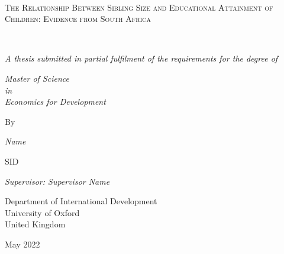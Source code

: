 \begin{titlepage}
	\centering
	\vspace*{1.5cm}
	\hrulefill\\
	\vspace{0.5cm}
	{\scshape\LARGE The Relationship Between Sibling Size and Educational Attainment of Children: Evidence from South Africa\par}
	\vspace{0.5cm}
	\hrulefill\\
	\vspace{1.5cm}

	{\normalsize\itshape A thesis submitted in partial fulfilment of the requirements for the degree of\par}
	
	\vspace{0.6cm}
	
	{\normalsize\itshape Master of Science \\ \vspace{0.2cm} in \\ \vspace{0.2cm} Economics for Development\par}
	
	\vspace{1.2cm}
	{\normalsize By \par}
	
	\vspace{1.2cm}
	{\large\itshape Name}
	
	\vspace{4pt}
	{\normalsize SID}
	
	\vspace{0.8cm}
	{\large\itshape Supervisor: Supervisor Name \par}
	
	\vspace{0.8cm}
	{\normalsize Department of International Development \\ \vspace{4pt}
	University of Oxford \\ \vspace{4pt}
	United Kingdom}
	
	\vspace{2.8cm}
	{\normalsize May 2022 \par}

\end{titlepage}